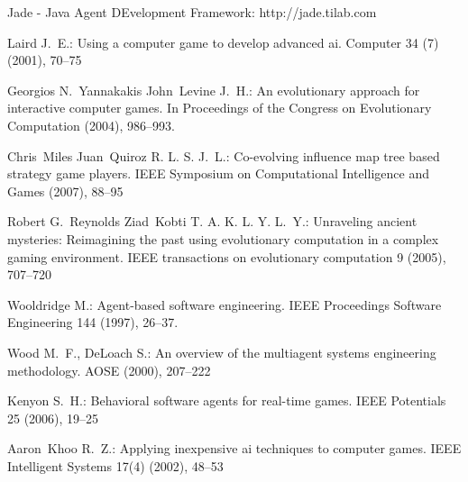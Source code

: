 \documentclass[runningheads]{llncs}
\begin{document}
\begin{thebibliography}{0}
Jade - Java Agent DEvelopment Framework:
http://jade.tilab.com

Laird J.~E.:
Using a computer game to develop advanced ai.
Computer 34 (7) (2001), 70--75

Georgios N.~Yannakakis John~Levine J.~H.:
An evolutionary approach for interactive computer games.
In Proceedings of the Congress on Evolutionary Computation (2004), 986--993.

Chris~Miles Juan~Quiroz R. L. S. J.~L.:
Co-evolving influence map tree based strategy game players.
IEEE Symposium on Computational Intelligence and Games (2007), 88--95

Robert G.~Reynolds Ziad~Kobti T. A. K. L. Y. L.~Y.:
Unraveling ancient mysteries: Reimagining the past using evolutionary
  computation in a complex gaming environment.
IEEE transactions on evolutionary computation 9 (2005), 707--720

Wooldridge M.:
Agent-based software engineering.
IEEE Proceedings Software Engineering 144 (1997), 26--37.

Wood M.~F., DeLoach S.:
An overview of the multiagent systems engineering methodology.
AOSE (2000), 207--222

Kenyon S.~H.:
Behavioral software agents for real-time games.
IEEE Potentials 25 (2006), 19--25

Aaron~Khoo R.~Z.:
Applying inexpensive ai techniques to computer games.
IEEE Intelligent Systems 17(4) (2002), 48--53

\end{thebibliography}
\end{document}
